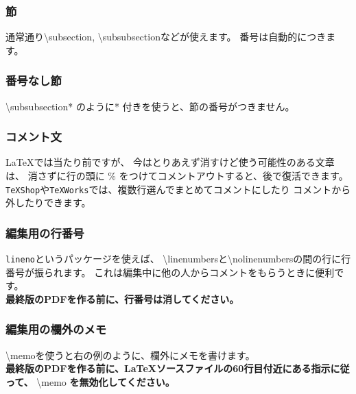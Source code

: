 \documentclass[11pt,a4j,dvipdfmx]{jarticle} 					%
\newcommand{\研究課題名}{象の卵}
\newcommand{\研究機関名}{逢坂大学}
\newcommand{\研究代表者氏名}{湯川秀樹}
\newcommand{\研究期間の最終元号年度}{6}  %
\newcommand{\memo}[1]{\marginpar{#1}}
\begin{document}
        \subsubsection{節}
        通常通り\textbackslash subsection, \textbackslash subsubsectionなどが使えます。
        番号は自動的につきます。
        
        \subsubsection*{番号なし節}
        \textbackslash subsubsection* のように* 付きを使うと、節の番号がつきません。
        
        \subsubsection{コメント文}
        \LaTeX では当たり前ですが、
        今はとりあえず消すけど使う可能性のある文章は、
        消さずに行の頭に \% をつけてコメントアウトすると、後で復活できます。
        \texttt{TeXShop}や\texttt{TeXWorks}では、複数行選んでまとめてコメントにしたり
        コメントから外したりできます。
        
        \subsubsection{編集用の行番号}
        \texttt{lineno}というパッケージを使えば、
        \textbackslash linenumbersと\textbackslash nolinenumbersの間の行に行番号が振られます。
        これは編集中に他の人からコメントをもらうときに便利です。\\
        \textbf{最終版のPDFを作る前に、行番号は消してください。}
        
        \subsubsection{編集用の欄外のメモ}
        \textbackslash memo{}を使うと右の例のように、欄外にメモを書けます。\\
        \memo{欄外メモ\\だよ}
        \textbf{最終版のPDFを作る前に、\LaTeX ソースファイルの60行目付近にある指示に従って、}
        \textbackslash memo \textbf{を無効化してください。}
        
        \nolinenumbers



\end{document}
